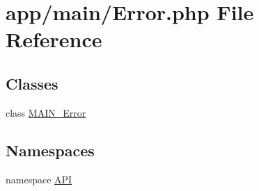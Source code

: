 \hypertarget{Error_8php}{
\section{app/main/Error.php File Reference}
\label{da/d79/Error_8php}
}
\subsection*{Classes}
\begin{DoxyCompactItemize}
\item 
class \hyperlink{classMAIN__Error}{MAIN\_\-Error}
\end{DoxyCompactItemize}
\subsection*{Namespaces}
\begin{DoxyCompactItemize}
\item 
namespace \hyperlink{namespaceAPI}{API}
\end{DoxyCompactItemize}
